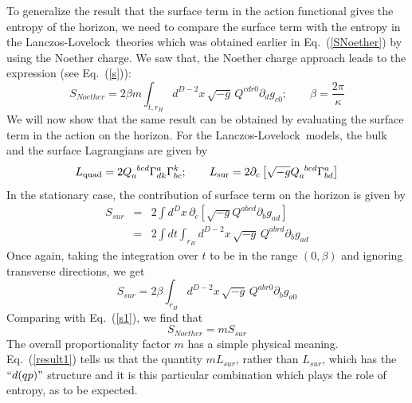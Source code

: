\documentclass[12pt]{iopart}
\def\eq#1{{Eq.~(\ref{#1})}}
\def\mes#1#2{\int_{#2} d^{#1}x\, \sqrt{-g}\, }
\newcommand{\LL}{Lanczos-Lovelock}
\def\mes#1#2{\int_{#2} d^{#1}x\, \sqrt{-g}\, }
\begin{document}
To generalize the result that the surface term in the action functional gives the entropy of the horizon, we need to compare the surface term with the entropy in the \LL\ theories 
which was obtained earlier  in \eq{SNoether} by using the Noether charge. We saw that, the Noether charge approach leads to the expression (see \eq{s}):
\begin{equation}
S_{Noether} = 2\beta m \mes{D-2}{t,r_H} Q^{cdr0}\partial_d g_{c0}; \qquad \beta = \frac{2\pi}{\kappa}
\label{s1}
\end{equation}  
We will now show that  the same  result can be  obtained by evaluating the surface term in the action on the horizon.
 For the \LL\ models, the bulk and the surface Lagrangians are given by 
 \begin{equation}
L_{\rm quad}=2Q_a^{\phantom{a}bcd}\Gamma^a_{dk}\Gamma^k_{bc};
\qquad
L_{\rm sur}=2\partial_c\left[\sqrt{-g}Q_a^{\phantom{a}bcd}\Gamma^a_{bd}\right]
\label{quadsur}
\end{equation}
  In the stationary case, the contribution of surface term on the horizon is given by
\begin{eqnarray}
S_{sur} &=& 2 \int d^D x \, \partial_c \left[ \sqrt{-g} Q^{abcd} \partial_b g_{ad}\right]\nonumber\\
&=& 2\int dt\mes{D-2}{r_H} Q^{abrd} \partial_b g_{ad}
\end{eqnarray} 
Once again, taking the integration over $t$ to be in the range $(0,\beta)$ and ignoring
transverse directions, we get
\begin{equation}
S_{sur} = 2\beta \mes{D-2}{r_H} Q^{abr0} \partial_b g_{a0}
\end{equation} 
Comparing with \eq{s1}, we find that 
\begin{equation}
S_{Noether} = mS_{sur}
\end{equation} 
The overall proportionality factor $m$ has a simple physical meaning. \eq{result1} tells us that the quantity $mL_{sur}$, rather than $L_{sur}$, which has the $``d(qp)"$ structure and it is this particular combination which plays the role of entropy, as to be expected. 
\end{document}
